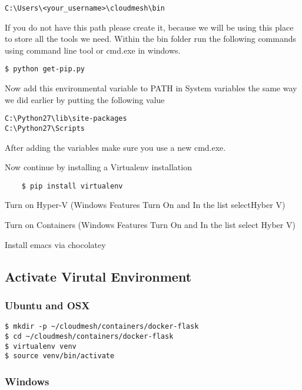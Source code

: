 \begin{lstlisting}
C:\Users\<your_username>\cloudmesh\bin
\end{lstlisting}

If you do not have this path please create it, because we will be using
this place to store all the tools we need. Within the bin folder run the
following commands using command line tool or cmd.exe in windows.

\begin{lstlisting}
$ python get-pip.py
\end{lstlisting}

Now add this environmental variable to PATH in System variables the same
way we did earlier by putting the following value

\begin{lstlisting}
C:\Python27\lib\site-packages
C:\Python27\Scripts
\end{lstlisting}

After adding the variables make sure you use a new cmd.exe.

Now continue by installing a Virtualenv installation

\begin{lstlisting}
    $ pip install virtualenv 
\end{lstlisting}

Turn on Hyper-V (Windows Features Turn On and In the list selectHyber V)

Turn on Containers (Windows Features Turn On and In the list select
Hyber V)

Install emacs via chocolatey

\subsection{Activate Virutal Environment}

\subsubsection{Ubuntu and OSX}

\begin{lstlisting}
$ mkdir -p ~/cloudmesh/containers/docker-flask
$ cd ~/cloudmesh/containers/docker-flask
$ virtualenv venv
$ source venv/bin/activate
\end{lstlisting}

\subsubsection{Windows}

